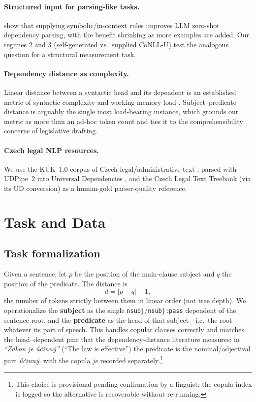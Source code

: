 \documentclass[11pt]{article}
\begin{document}
\paragraph{Structured input for parsing-like tasks.} \citet{ginn2025llm} show that supplying
symbolic/in-context rules improves LLM zero-shot dependency parsing, with the benefit shrinking as
more examples are added. Our regimes 2 and 3 (self-generated vs.\ supplied CoNLL-U) test the analogous
question for a structural measurement task.

\paragraph{Dependency distance as complexity.} Linear distance between a syntactic head and its
dependent is an established metric of syntactic complexity and working-memory load
\citep{gao2024dependency,liang2007dependency}. Subject--predicate distance is arguably the single
most load-bearing instance, which grounds our metric as more than an ad-hoc token count and ties it
to the comprehensibility concerns of legislative drafting.

\paragraph{Czech legal NLP resources.} We use the KUK~1.0 corpus of Czech legal/administrative text
\citep{hladka2024kuk}, parsed with UDPipe~2 \citep{straka2018udpipe} into Universal Dependencies
\citep{nivre2020ud}, and the Czech Legal Text Treebank \citep{kriz2018cltt} (via its UD conversion)
as a human-gold parser-quality reference.

\section{Task and Data}

\subsection{Task formalization}
Given a sentence, let $p$ be the position of the main-clause subject and $q$ the position of the
predicate. The distance is
\begin{equation}
d = |p - q| - 1,
\end{equation}
the number of tokens strictly between them in linear order (not tree depth). We operationalize the
\textbf{subject} as the single \texttt{nsubj}/\texttt{nsubj:pass} dependent of the sentence root,
and the \textbf{predicate} as the head of that subject---i.e.\ the root---whatever its part of
speech. This handles copular clauses correctly and matches the head--dependent pair that the
dependency-distance literature measures: in \emph{``Z\'{a}kon je \'{u}\v{c}inn\'{y}''} (``The law is
effective'') the predicate is the nominal/adjectival part \emph{\'{u}\v{c}inn\'{y}}, with the copula
\emph{je} recorded separately.\footnote{This choice is provisional pending confirmation by a
linguist; the copula index is logged so the alternative is recoverable without re-running.}
\end{document}
